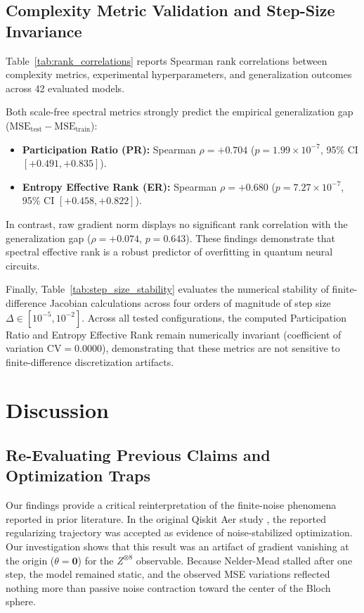 \documentclass[sn-apacite,Numbered]{sn-jnl}
\begin{document}
\subsection{Complexity Metric Validation and Step-Size Invariance}

Table~\ref{tab:rank_correlations} reports Spearman rank correlations between complexity metrics, experimental hyperparameters, and generalization outcomes across 42 evaluated models.



Both scale-free spectral metrics strongly predict the empirical generalization gap ($\text{MSE}_{\text{test}} - \text{MSE}_{\text{train}}$):
\begin{itemize}
    \item \textbf{Participation Ratio (PR):} Spearman $\rho = +0.704$ ($p = 1.99 \times 10^{-7}$, 95\% CI $[+0.491, +0.835]$).
    \item \textbf{Entropy Effective Rank (ER):} Spearman $\rho = +0.680$ ($p = 7.27 \times 10^{-7}$, 95\% CI $[+0.458, +0.822]$).
\end{itemize}
In contrast, raw gradient norm displays no significant rank correlation with the generalization gap ($\rho = +0.074$, $p = 0.643$). These findings demonstrate that spectral effective rank is a robust predictor of overfitting in quantum neural circuits.



Finally, Table~\ref{tab:step_size_stability} evaluates the numerical stability of finite-difference Jacobian calculations across four orders of magnitude of step size $\Delta \in [10^{-5}, 10^{-2}]$. Across all tested configurations, the computed Participation Ratio and Entropy Effective Rank remain numerically invariant (coefficient of variation $\text{CV} = 0.0000$), demonstrating that these metrics are not sensitive to finite-difference discretization artifacts.

\section{Discussion}\label{sec:discussion}

\subsection{Re-Evaluating Previous Claims and Optimization Traps}
Our findings provide a critical reinterpretation of the finite-noise phenomena reported in prior literature. In the original Qiskit Aer study \cite{fnqgnnmd_repo}, the reported regularizing trajectory was accepted as evidence of noise-stabilized optimization. Our investigation shows that this result was an artifact of gradient vanishing at the origin ($\theta = \mathbf{0}$) for the $Z^{\otimes 8}$ observable. Because Nelder-Mead stalled after one step, the model remained static, and the observed MSE variations reflected nothing more than passive noise contraction toward the center of the Bloch sphere.
\end{document}
